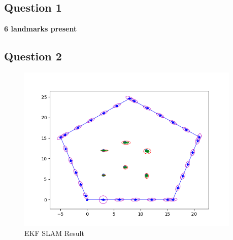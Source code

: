 \documentclass[12pt, a4paper]{article}
\begin{document}
\subsection*{Question 1}
\textbf{6 landmarks present}
\subsection*{Question 2}
\begin{figure}
    \includegraphics[width=0.95\textwidth]{EKF_SLAM_Result.png}
    \caption{EKF SLAM Result}
\end{figure}
\end{document}
